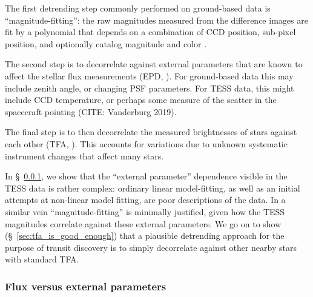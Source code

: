\documentclass[12pt,twocolumn,tighten]{aastex62}
\begin{document}
The first detrending step commonly performed on ground-based data is
``magnitude-fitting'': the raw magnitudes measured from the difference
images are fit by a polynomial that depends on a combination of CCD
position, sub-pixel position, and optionally catalog magnitude and
color \citep[][Sec.~5.5]{zhang_precision_2016}.

The second step is to decorrelate against external parameters that are
known to affect the stellar flux measurements (EPD,
\citealt[][~Appendix]{bakos_2010}).  For ground-based data this may include zenith
angle, or changing PSF parameters.  For TESS data, this might include
CCD temperature, or perhaps some measure of the scatter in the spacecraft
pointing (CITE: Vanderburg 2019).

The final step is to then decorrelate the measured brightnesses of
stars against each other (TFA, \citealt{kovacs_trend_2005}).  
This accounts for variations due to unknown systematic
instrument changes that affect many stars.


In \S~\ref{sec:flux_vs_external_parameters}, we show that the
``external parameter'' dependence visible in the TESS data is rather
complex: ordinary linear model-fitting, as well as an initial attempts
at non-linear model fitting, are poor descriptions of the data.  
In a similar vein ``magnitude-fitting'' is minimally justified, given
how the TESS magnitudes correlate against these external parameters.
We go on to show (\S~\ref{sec:tfa_is_good_enough}) that a plausible
detrending approach for the purpose of transit discovery is to simply
decorrelate against other nearby stars with standard TFA.


\subsubsection{Flux versus external parameters}
\label{sec:flux_vs_external_parameters}


\end{document}
